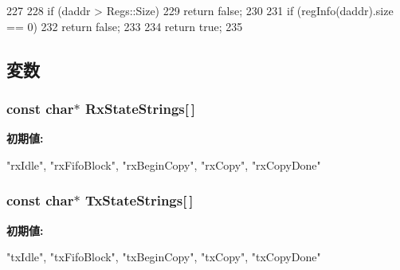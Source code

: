 \begin{DoxyCode}
227 {
228     if (daddr > Regs::Size)
229         return false;
230 
231     if (regInfo(daddr).size == 0)
232         return false;
233 
234     return true;
235 }
\end{DoxyCode}


\subsection{変数}
\hypertarget{namespaceSinic_aafc3b60f55352a04a630cfd84d9d641a}{
\subsubsection[{RxStateStrings}]{\setlength{\rightskip}{0pt plus 5cm}const char$\ast$ {\bf RxStateStrings}\mbox{[}$\,$\mbox{]}}}
\label{namespaceSinic_aafc3b60f55352a04a630cfd84d9d641a}
{\bfseries 初期値:}
\begin{DoxyCode}

{
    "rxIdle",
    "rxFifoBlock",
    "rxBeginCopy",
    "rxCopy",
    "rxCopyDone"
}
\end{DoxyCode}
\hypertarget{namespaceSinic_af3483fda812098251269cec3e53de3b7}{
\subsubsection[{TxStateStrings}]{\setlength{\rightskip}{0pt plus 5cm}const char$\ast$ {\bf TxStateStrings}\mbox{[}$\,$\mbox{]}}}
\label{namespaceSinic_af3483fda812098251269cec3e53de3b7}
{\bfseries 初期値:}
\begin{DoxyCode}

{
    "txIdle",
    "txFifoBlock",
    "txBeginCopy",
    "txCopy",
    "txCopyDone"
}
\end{DoxyCode}

